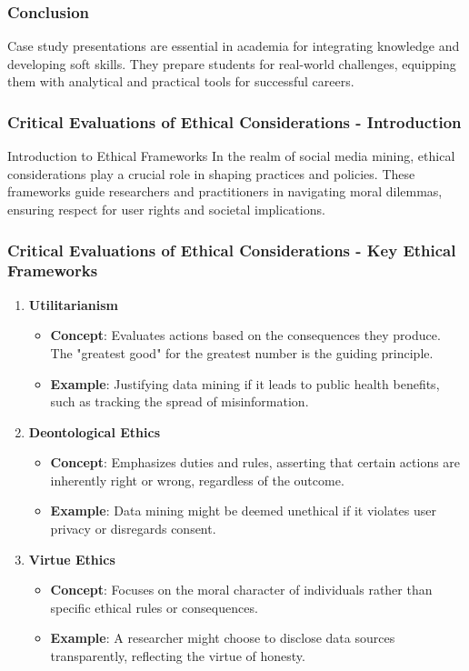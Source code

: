 \documentclass{beamer}
\begin{document}
\begin{frame}[fragile]
    \frametitle{Conclusion}
    Case study presentations are essential in academia for integrating knowledge and developing soft skills. 
    They prepare students for real-world challenges, equipping them with analytical and practical tools for successful careers.
\end{frame}

\begin{frame}[fragile]
    \frametitle{Critical Evaluations of Ethical Considerations - Introduction}
    \begin{block}{Introduction to Ethical Frameworks}
        In the realm of social media mining, ethical considerations play a crucial role in shaping practices and policies. 
        These frameworks guide researchers and practitioners in navigating moral dilemmas, ensuring respect for user rights and societal implications.
    \end{block}
\end{frame}

\begin{frame}[fragile]
    \frametitle{Critical Evaluations of Ethical Considerations - Key Ethical Frameworks}
    \begin{enumerate}
        \item \textbf{Utilitarianism}
            \begin{itemize}
                \item \textbf{Concept}: Evaluates actions based on the consequences they produce. The "greatest good" for the greatest number is the guiding principle.
                \item \textbf{Example}: Justifying data mining if it leads to public health benefits, such as tracking the spread of misinformation.
            \end{itemize}
        \item \textbf{Deontological Ethics}
            \begin{itemize}
                \item \textbf{Concept}: Emphasizes duties and rules, asserting that certain actions are inherently right or wrong, regardless of the outcome.
                \item \textbf{Example}: Data mining might be deemed unethical if it violates user privacy or disregards consent.
            \end{itemize}
        \item \textbf{Virtue Ethics}
            \begin{itemize}
                \item \textbf{Concept}: Focuses on the moral character of individuals rather than specific ethical rules or consequences.
                \item \textbf{Example}: A researcher might choose to disclose data sources transparently, reflecting the virtue of honesty.
            \end{itemize}
    \end{enumerate}
\end{frame}
\end{document}

